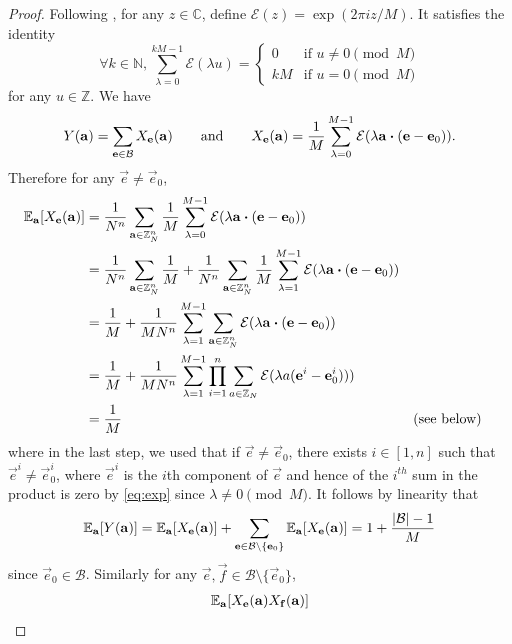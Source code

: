 \begin{proof}
Following \cite{NSS01}, for any $z\in\mathbb{C}$, define $\mathcal{E}(z)=\exp(2\pi iz/M)$. It satisfies the identity
\begin{equation}
\label{eq:exp}
\forall k\in \mathbb{N},
\sum_{\lambda=0}^{kM-1}\mathcal{E}(\lambda u)=
        \begin{cases}0&\text{if }u\neq 0\pmod{M}\\kM&\text{if }u=0\pmod{M}\end{cases}
\end{equation}
for any $u\in\mathbb{Z}$. We have
\[
	Y(\mathbf{a})=\sum_{\mathbf{e}\in\mathcal{B}}X_{\mathbf{e}}(\mathbf{a})
	\qquad\text{and}\qquad
    X_{\mathbf{e}}(\mathbf{a})=\frac{1}{M}\sum_{\lambda=0}^{M-1}
        \mathcal{E}(\lambda\mathbf{a}\boldsymbol{\cdot}(\mathbf{e}-\mathbf{e}_0)).
\]
Therefore for any $\vec{e}\neq\vec{e}_0$,
\begin{align*}
	\mathbb{E}_{\mathbf{a}}[X_{\mathbf{e}}(\mathbf{a})]
	&=\frac{1}{N^{n}}\sum_{\mathbf{a}\in \mathbb{Z}_{N}^n} \frac{1}{M}
		\sum_{\lambda=0}^{M-1}
		\mathcal{E}(\lambda\mathbf{a}\boldsymbol{\cdot}(\mathbf{e}-\mathbf{e}_0))\\
	&=\frac{1}{N^{n}}\sum_{\mathbf{a}\in \mathbb{Z}_{N}^n} \frac{1}{M}
	+\frac{1}{N^{n}}\sum_{\mathbf{a}\in \mathbb{Z}_{N}^n}\frac{1}{M}
		\sum_{\lambda=1}^{M-1}
		\mathcal{E}(\lambda\mathbf{a}\boldsymbol{\cdot}(\mathbf{e}-\mathbf{e}_0))\\
	&=\frac{1}{M}+\frac{1}{MN^{n}}\sum_{\lambda=1}^{M-1}
		\sum_{\mathbf{a}\in \mathbb{Z}_{N}^n}
	 	\mathcal{E}(\lambda\mathbf{a}\boldsymbol{\cdot}(\mathbf{e}-\mathbf{e}_0))\\
	&=\frac{1}{M}+\frac{1}{MN^{n}}\sum_{\lambda=1}^{M-1}
			\prod_{i=1}^n\sum_{a\in \mathbb{Z}_{N}}
			\mathcal{E}(\lambda a(\mathbf{e}^i-\mathbf{e}_0^i)))\\
&=\frac{1}{M}&&\text{(see below)}
\end{align*}
where in the last step, we used that if $\vec{e}\neq\vec{e}_0$,
there exists $i\in [1,n]$ such that $\vec{e}^i\neq\vec{e}_0^i$,
where $\vec{e}^i$ is the $i$th component of $\vec{e}$ and
hence of the $i^{th}$ sum in the product is zero by \eqref{eq:exp}
since $\lambda\neq 0\pmod M$. It follows by linearity that
\[
	\mathbb{E}_{\mathbf{a}}[Y(\mathbf{a})]
		=\mathbb{E}_{\mathbf{a}}[X_{\mathbf{e}}(\mathbf{a})]
			+\sum_{\mathbf{e}\in\mathcal{B}\setminus\{\mathbf{e}_0\}}
				\mathbb{E}_{\mathbf{a}}[X_{\mathbf{e}}(\mathbf{a})]
		=1+\frac{|\mathcal{B}|-1}{M}
\]
since $\vec{e}_0\in\mathcal{B}$.
Similarly for any
$\vec{e},\vec{f}\in\mathcal{B}\setminus\{\vec{e}_0\}$,
\begin{align*}
	\Exp{\vec{a}}{X_{\vec{e}}(\vec{a})X_{\vec{f}}(\vec{a})}

\end{align*}
\end{proof}
